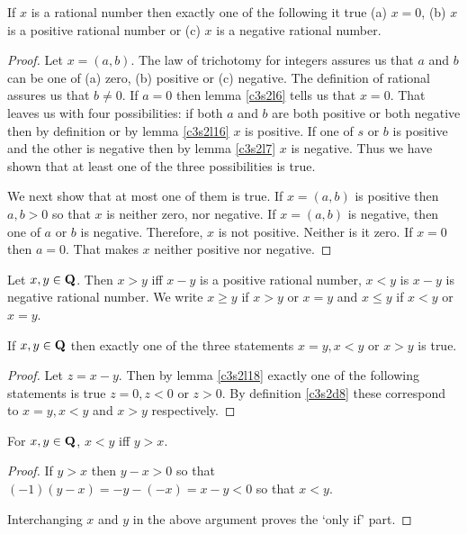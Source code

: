 \begin{lem}\label{c3s2l18}
If $x$ is a rational number then exactly one of the following it true (a)
$x = 0$, (b) $x$ is a positive rational number or (c) $x$ is a negative
rational number.
\end{lem}
\begin{proof}
Let $x = (a, b)$. The law of trichotomy for integers assures us that $a$
and $b$ can be one of (a) zero, (b) positive or (c) negative. The 
definition of rational assures us that $b \ne 0$. If $a = 0$ then lemma
\ref{c3s2l6} tells us that $x = 0$. That leaves us with four possibilities:
if both $a$ and $b$ are both positive or both negative then by definition
or by lemma \ref{c3s2l16} $x$ is positive. If one of $s$ or $b$ is positive
and the other is negative then by lemma \ref{c3s2l7} $x$ is negative. Thus
we have shown that at least one of the three possibilities is true.

We next show that at most one of them is true. If $x = (a, b)$ is positive
then $a, b > 0$ so that $x$ is neither zero, nor negative. If $x = (a, b)$
is negative, then one of $a$ or $b$ is negative. Therefore, $x$ is not
positive. Neither is it zero. If $x = 0$ then $a = 0$. That makes $x$ 
neither positive nor negative.
\end{proof}

\begin{defn}\label{c3s2d8}
Let $x, y \in \mathbf{Q}$. Then $x > y$ iff $x - y$ is a positive rational number,
$x < y$ is $x - y$ is negative rational number. We write $x \ge y$ if 
$x > y$ or $x = y$ and $x \le y$ if $x < y$ or $x = y$.
\end{defn}

\begin{lem}\label{c3s2l19}
If $x, y \in \mathbf{Q}$ then exactly one of the three statements $x = y, x < y$
or $x > y$ is true.
\end{lem}
\begin{proof}
Let $z = x - y$. Then by lemma \ref{c3s2l18} exactly one of the following
statements is true $z = 0, z < 0$ or $z > 0$. By definition \ref{c3s2d8}
these correspond to $x = y, x < y$ and $x > y$ respectively.
\end{proof}

\begin{lem}\label{c3s2l20}
For $x, y \in \mathbf{Q}$, $x < y$ iff $y > x$.
\end{lem}
\begin{proof}
If $y > x$ then $y - x > 0$ so that $(-1)(y - x) = -y -(-x) = x - y < 0$ so
that $x < y$. 

Interchanging $x$ and $y$ in the above argument proves the `only if' part.
\end{proof}


